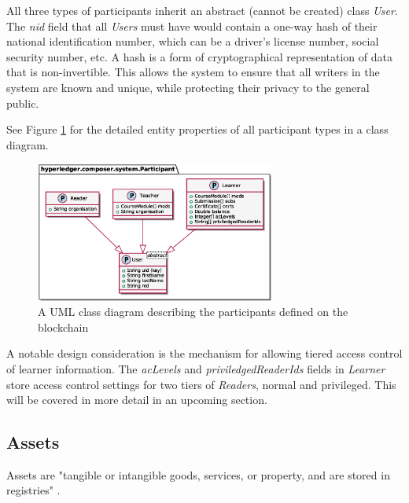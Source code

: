 All three types of participants inherit an abstract (cannot be created) class \textit{User}. The \textit{nid} field
that all \textit{Users} must have would contain a one-way hash of their national identification number, which can be a
driver's license number, social security number, etc. A hash is a form
of cryptographical representation of data that is non-invertible. This allows the system to ensure that
all writers in the system are known and unique, while protecting their privacy to the general public.

See Figure \ref{fig:participants} for the detailed entity properties of all participant types
in a class diagram.

\begin{figure}[!ht]
	\centering
	\includegraphics[width=0.7\textwidth]{participants}
	\caption[Participants Class Diagram]
	{A UML class diagram describing the participants defined on the blockchain}
	\label{fig:participants}
\end{figure}

A notable design consideration is the mechanism for allowing tiered access control of
learner information. The \textit{acLevels} and \textit{priviledgedReaderIds} fields in \textit{Learner}
store access control settings for two tiers of \textit{Readers}, normal and privileged.
This will be covered in more detail in an upcoming section.

\subsection{Assets}

Assets are "tangible or intangible goods, services, or property, and are stored in registries" \citep{official2018composer}.

